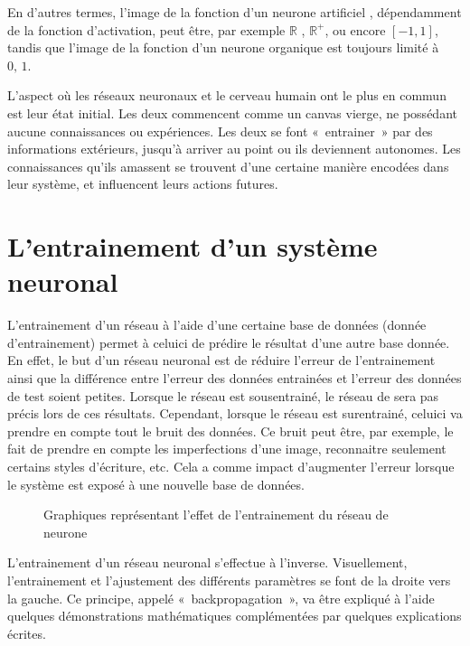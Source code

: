\documentclass[letterpaper,10pt,french]{sphinxmanual}
\begin{document}
En d’autres termes, l’image de la fonction d’un neurone artificiel , dépendamment de la fonction d’activation, peut être,
par exemple \(\mathbb{R}\) , \(\mathbb{R^+}\), ou encore \([-1, 1]\),
tandis que l’image de la fonction d’un neurone organique  est toujours limité à \(\text{{0, 1}}\).

L’aspect où les réseaux neuronaux et le cerveau humain ont le plus en commun est leur état initial. Les deux commencent comme un canvas vierge, ne possédant
aucune connaissances ou expériences. Les deux se font « entrainer » par des informations extérieurs, jusqu’à arriver au point ou ils deviennent autonomes.
Les connaissances qu’ils amassent se trouvent d’une certaine manière encodées dans leur système, et influencent leurs actions futures.


\section{L’entrainement d’un système neuronal}
\label{\detokenize{training:l-entrainement-d-un-systeme-neuronal}}\label{\detokenize{training::doc}}
L’entrainement d’un réseau à l’aide d’une certaine base de données (donnée d’entrainement) permet à celui\sphinxhyphen{}ci de prédire le résultat
d’une autre base donnée. En effet, le but d’un réseau neuronal est de réduire l’erreur de l’entrainement ainsi que la différence
entre l’erreur des données entrainées et l’erreur des données de test soient petites. Lorsque le réseau est sous\sphinxhyphen{}entrainé,
le réseau de sera pas précis lors de ces résultats. Cependant, lorsque le réseau est sur\sphinxhyphen{}entrainé, celui\sphinxhyphen{}ci va prendre en compte
tout le bruit des données. Ce bruit peut être, par exemple, le fait de prendre en compte les imperfections d’une image, reconnaitre
seulement certains styles d’écriture, etc. Cela a comme impact d’augmenter l’erreur lorsque le système est exposé à une nouvelle base de données.

\begin{figure}[htbp]
\centering
\capstart

\noindent{}
\caption{Graphiques représentant l’effet de l’entrainement du réseau de neurone}\label{\detokenize{training:overfitting}}\end{figure}

L’entrainement d’un réseau neuronal s’effectue à l’inverse. Visuellement, l’entrainement et l’ajustement des différents
paramètres se font de la droite vers la gauche. Ce principe, appelé « backpropagation », va être expliqué à l’aide quelques
démonstrations mathématiques complémentées par quelques explications écrites.
\end{document}
